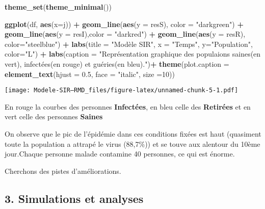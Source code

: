 \documentclass[
]{article}
\newenvironment{Shaded}{\begin{snugshade}}{\end{snugshade}}
\newcommand{\DataTypeTok}[1]{\textcolor[rgb]{0.13,0.29,0.53}{#1}}
\newcommand{\DecValTok}[1]{\textcolor[rgb]{0.00,0.00,0.81}{#1}}
\newcommand{\FloatTok}[1]{\textcolor[rgb]{0.00,0.00,0.81}{#1}}
\newcommand{\KeywordTok}[1]{\textcolor[rgb]{0.13,0.29,0.53}{\textbf{#1}}}
\newcommand{\NormalTok}[1]{#1}
\newcommand{\OperatorTok}[1]{\textcolor[rgb]{0.81,0.36,0.00}{\textbf{#1}}}
\newcommand{\StringTok}[1]{\textcolor[rgb]{0.31,0.60,0.02}{#1}}
\begin{document}
\begin{Shaded}
\begin{Highlighting}[]
\KeywordTok{theme_set}\NormalTok{(}\KeywordTok{theme_minimal}\NormalTok{())}

\KeywordTok{ggplot}\NormalTok{(df, }\KeywordTok{aes}\NormalTok{(}\DataTypeTok{x=}\NormalTok{j)) }\OperatorTok{+}\StringTok{ }\KeywordTok{geom_line}\NormalTok{(}\KeywordTok{aes}\NormalTok{(}\DataTypeTok{y =}\NormalTok{ resS), }\DataTypeTok{color =} \StringTok{"darkgreen"}\NormalTok{) }\OperatorTok{+}\StringTok{ }\KeywordTok{geom_line}\NormalTok{(}\KeywordTok{aes}\NormalTok{(}\DataTypeTok{y =}\NormalTok{ resI),}\DataTypeTok{color =} \StringTok{"darkred"}\NormalTok{) }\OperatorTok{+}\StringTok{ }\KeywordTok{geom_line}\NormalTok{(}\KeywordTok{aes}\NormalTok{(}\DataTypeTok{y =}\NormalTok{ resR), }\DataTypeTok{color=}\StringTok{"steelblue"}\NormalTok{) }\OperatorTok{+}\StringTok{ }\KeywordTok{labs}\NormalTok{(}\DataTypeTok{title =} \StringTok{"Modèle SIR"}\NormalTok{, }\DataTypeTok{x =} \StringTok{"Temps"}\NormalTok{, }\DataTypeTok{y=}\StringTok{"Population"}\NormalTok{, }\DataTypeTok{color=}\StringTok{"L"}\NormalTok{) }\OperatorTok{+}\StringTok{ }\KeywordTok{labs}\NormalTok{(}\DataTypeTok{caption =} \StringTok{"Représentation graphique des populaions saines(en vert), infectées(en rouge) et guéries(en bleu)."}\NormalTok{)}\OperatorTok{+}\StringTok{ }\KeywordTok{theme}\NormalTok{(}\DataTypeTok{plot.caption =} \KeywordTok{element_text}\NormalTok{(}\DataTypeTok{hjust =} \FloatTok{0.5}\NormalTok{, }\DataTypeTok{face =} \StringTok{"italic"}\NormalTok{, }\DataTypeTok{size =}\DecValTok{10}\NormalTok{))}
\end{Highlighting}
\end{Shaded}

\texttt{[image: Modele-SIR---RMD\_files/figure-latex/unnamed-chunk-5-1.pdf]}

En rouge la courbes des personnes \textbf{Infectées}, en bleu celle des
\textbf{Retirées} et en vert celle des personnes \textbf{Saines}

On observe que le pic de l'épidémie dans ces conditions fixées est haut
(quasiment toute la population a attrapé le virus (88,7\%)) et se touve
aux alentour du 10ème jour.Chaque personne malade contamine 40
personnes, ce qui est énorme.

Cherchons des pistes d'améliorations.

\hypertarget{simulations-et-analyses}{%
\subsection{3. Simulations et analyses}\label{simulations-et-analyses}}
\end{document}
